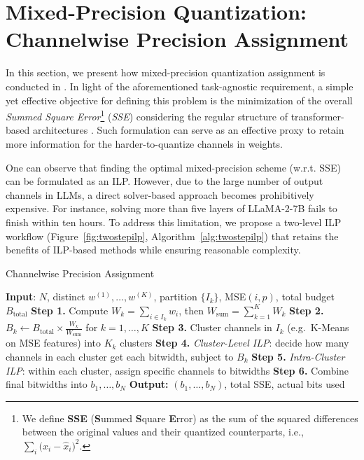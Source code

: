 \section{Mixed-Precision Quantization: Channelwise Precision Assignment} \label{sec:assigner}


In this section, we present how mixed-precision quantization assignment is conducted in \FWName. In light of the aforementioned task-agnostic requirement, a simple yet effective objective for defining this problem is the minimization of the overall \textit{Summed Square Error}\footnote{We define \textbf{SSE} (\textbf{S}ummed 
\textbf{S}quare \textbf{E}rror) as the sum of the squared differences between 
the original values and their quantized counterparts, i.e., 
$\sum_{i} \bigl(x_i - \widehat{x}_i\bigr)^2$.} (\textit{SSE}) considering the regular structure of transformer-based architectures \cite{waswani2017attention,dubey2024llama,touvron2023llama}. Such formulation can serve as an effective proxy to retain more information for the harder-to-quantize channels in weights.

One can observe that finding the optimal mixed-precision scheme (w.r.t. SSE) can be formulated as an ILP. However, due to the large number of output channels in LLMs, a direct solver-based approach becomes prohibitively expensive. For instance, solving more than five layers of LLaMA-2-7B fails to finish within ten hours. To address this limitation, we propose a two-level ILP workflow (Figure~\ref{fig:twostepilp}, Algorithm~\ref{alg:twostepilp}) that retains the benefits of ILP-based methods while ensuring reasonable complexity.




\begin{algorithm}[ht]
\setlength{\abovecaptionskip}{-8pt}
\setlength{\belowcaptionskip}{-10pt}
\caption{Channelwise Precision Assignment}
\begin{algorithmic}[1]
  \STATE \textbf{Input}: $N$, distinct $w^{(1)},\dots,w^{(K)}$, partition $\{I_k\}$, MSE$(i,p)$, total budget $B_{\text{total}}$
  \STATE \textbf{Step 1.} Compute $W_k = \sum_{i\in I_k} w_i$, then $W_{\text{sum}} = \sum_{k=1}^K W_k$
  \STATE \textbf{Step 2.} $B_k \leftarrow B_{\text{total}} \times \frac{W_k}{W_{\text{sum}}}$ for $k=1,\dots,K$
    \STATE \textbf{Step 3.} Cluster channels in $I_k$ (e.g.\ K-Means on MSE features) into $K_k$ clusters
    \STATE \textbf{Step 4.} \emph{Cluster-Level ILP}: decide how many channels in each cluster get each bitwidth, subject to $B_k$
    \STATE \textbf{Step 5.} \emph{Intra-Cluster ILP}: within each cluster, assign specific channels to bitwidths
  \ENDFOR
  \STATE \textbf{Step 6.} Combine final bitwidths into $b_1, \ldots, b_N$
  \STATE \textbf{Output:} $(b_1,\dots,b_N)$, total SSE, actual bits used
\end{algorithmic}
\label{alg:twostepilp}

\end{algorithm}



